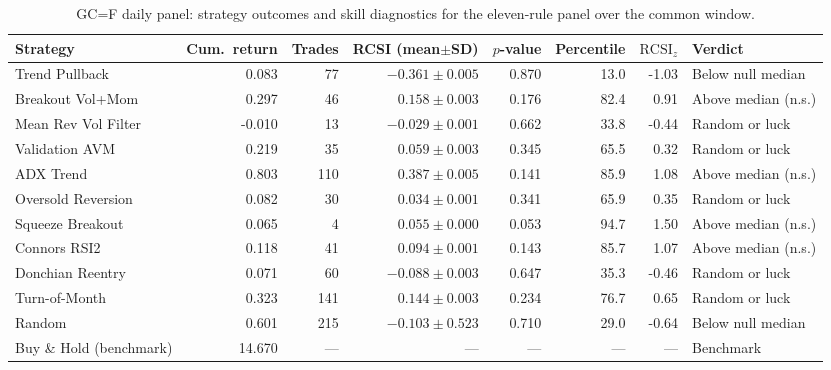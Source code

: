 \documentclass[risks,article,submit,pdftex,oneauthor]{Definitions/mdpi}
\begin{document}
\begin{table}[t]
\centering
\caption{GC=F daily panel: strategy outcomes and skill diagnostics for the eleven-rule panel over the common window.}
\label{tab:main}
{\small
\renewcommand{\arraystretch}{1.15}
\setlength{\tabcolsep}{5pt}
\begin{adjustbox}{max width=\textwidth}
\begin{tabular}{@{}lrrrrrrl@{}}
\toprule
Strategy & Cum.\ return & Trades & RCSI (mean$\pm$SD) & $p$-value & Percentile & $\mathrm{RCSI}_z$ & Verdict \\
\midrule
Trend Pullback      & 0.083 &  77 & $-0.361\pm0.005$ & 0.870 & 13.0 & -1.03 & Below null median \\
Breakout Vol+Mom    & 0.297 &  46 & $\phantom{-}0.158\pm0.003$ & 0.176 & 82.4 & \phantom{-}0.91 & Above median (n.s.) \\
Mean Rev Vol Filter & -0.010 & 13 & $-0.029\pm0.001$ & 0.662 & 33.8 & -0.44 & Random or luck \\
Validation AVM      & 0.219 &  35 & $\phantom{-}0.059\pm0.003$ & 0.345 & 65.5 & \phantom{-}0.32 & Random or luck \\
ADX Trend           & 0.803 & 110 & $\phantom{-}0.387\pm0.005$ & 0.141 & 85.9 & \phantom{-}1.08 & Above median (n.s.) \\
Oversold Reversion  & 0.082 &  30 & $\phantom{-}0.034\pm0.001$ & 0.341 & 65.9 & \phantom{-}0.35 & Random or luck \\
Squeeze Breakout    & 0.065 &   4 & $\phantom{-}0.055\pm0.000$ & 0.053 & 94.7 & \phantom{-}1.50 & Above median (n.s.) \\
Connors RSI2        & 0.118 &  41 & $\phantom{-}0.094\pm0.001$ & 0.143 & 85.7 & \phantom{-}1.07 & Above median (n.s.) \\
Donchian Reentry    & 0.071 &  60 & $-0.088\pm0.003$ & 0.647 & 35.3 & -0.46 & Random or luck \\
Turn-of-Month       & 0.323 & 141 & $\phantom{-}0.144\pm0.003$ & 0.234 & 76.7 & \phantom{-}0.65 & Random or luck \\
Random              & 0.601 & 215 & $-0.103\pm0.523$ & 0.710 & 29.0 & -0.64 & Below null median \\
\midrule
Buy \& Hold (benchmark) & 14.670 & --- & --- & --- & --- & --- & Benchmark \\
\bottomrule
\end{tabular}
\end{adjustbox}
}
\par\vspace{0.75em}

\end{table}
\end{document}
